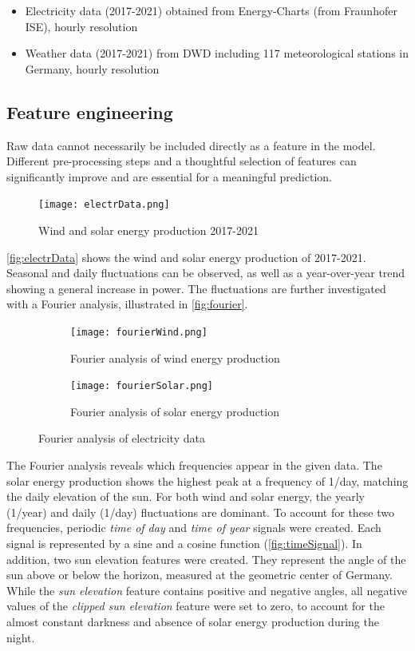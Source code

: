\documentclass[11pt,table]{article}
\begin{document}
\begin{itemize}
  \item Electricity data (2017-2021) obtained from Energy-Charts (from Fraunhofer ISE), hourly resolution \cite{energy_charts_stromproduktion}
  \item Weather data (2017-2021) from \ac{DWD} including 117 meteorological stations in Germany, hourly resolution \cite{DWD_API,DWD_Data}
\end{itemize}

\subsection{Feature engineering}
Raw data cannot necessarily be included directly as a feature in the model. Different pre-processing steps and a thoughtful selection of features can significantly improve and are essential for a meaningful prediction.

\begin{figure}[ht]
	\centering
	\texttt{[image: electrData.png]}
	\caption{Wind and solar energy production 2017-2021}
	\label{fig:electrData}
\end{figure}

\autoref{fig:electrData} shows the wind and solar energy production of 2017-2021. Seasonal and daily fluctuations can be observed, as well as a year-over-year trend showing a general increase in power. The fluctuations are further investigated with a Fourier analysis, illustrated in \autoref{fig:fourier}.

\begin{figure}[ht]
\centering
\begin{subfigure}{.5\textwidth}
  \centering
  \texttt{[image: fourierWind.png]}
  \label{fig:fourierWind}
  \caption{Fourier analysis of wind energy production}
\end{subfigure}%
\begin{subfigure}{.5\textwidth}
  \centering
  \texttt{[image: fourierSolar.png]}
  \label{fig:fourierSolar}
  \caption{Fourier analysis of solar energy production}
\end{subfigure}
\caption{Fourier analysis of electricity data}
\label{fig:fourier}
\end{figure}

The Fourier analysis reveals which frequencies appear in the given data. The solar energy production shows the highest peak at a frequency of 1/day, matching the daily elevation of the sun. For both wind and solar energy, the yearly (1/year) and daily (1/day) fluctuations are dominant.
To account for these two frequencies, periodic \textit{time of day} and \textit{time of year} signals were created. Each signal is represented by a sine and a cosine function (\autoref{fig:timeSignal}). 
In addition, two sun elevation features were created. They represent the angle of the sun above or below the horizon, measured at the geometric center of Germany. While the \textit{sun elevation} feature contains positive and negative angles, all negative values of the \textit{clipped sun elevation} feature were set to zero, to account for the almost constant darkness and absence of solar energy production during the night.
\end{document}
